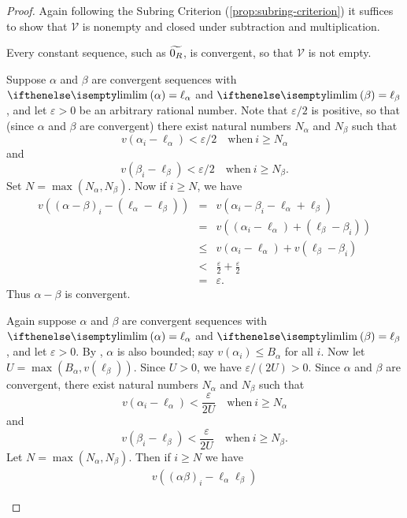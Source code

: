 \begin{proof}
Again following the Subring Criterion (\ref{prop:subring-criterion}) it suffices to show that \(\mathcal{V}\) is nonempty and closed under subtraction and multiplication.
\begin{inlineproplist}
\item Every constant sequence, such as \(\widetilde{0_R}\), is convergent, so that \(\mathcal{V}\) is not empty.
\item Suppose \(\alpha\) and \(\beta\) are convergent sequences with \(\LIM{\alpha} = \ell_\alpha\) and \(\LIM{\beta} = \ell_\beta\), and let \(\varepsilon > 0\) be an arbitrary rational number. Note that \(\varepsilon/2\) is positive, so that (since \(\alpha\) and \(\beta\) are convergent) there exist natural numbers \(N_\alpha\) and \(N_\beta\) such that \[ v(\alpha_i - \ell_\alpha) < \varepsilon/2 \quad \mathrm{when}\ i \geq N_\alpha \] and \[ v(\beta_i - \ell_\beta) < \varepsilon/2 \quad \mathrm{when}\ i \geq N_\beta. \] Set \(N = \max(N_\alpha, N_\beta)\). Now if \(i \geq N\), we have
\begin{eqnarray*}
v\left((\alpha - \beta)_i - (\ell_\alpha - \ell_\beta)\right)
 & = & v(\alpha_i - \beta_i - \ell_\alpha + \ell_\beta) \\
 & = & v\left((\alpha_i - \ell_\alpha) + (\ell_\beta - \beta_i)\right) \\
 & \leq & v(\alpha_i - \ell_\alpha) + v(\ell_\beta - \beta_i) \\
 & < & \frac{\varepsilon}{2} + \frac{\varepsilon}{2} \\
 & = & \varepsilon.
\end{eqnarray*}
Thus \(\alpha - \beta\) is convergent.
\item Again suppose \(\alpha\) and \(\beta\) are convergent sequences with \(\LIM{\alpha} = \ell_\alpha\) and \(\LIM{\beta} = \ell_\beta\), and let \(\varepsilon > 0\). By , \(\alpha\) is also bounded; say \(v(\alpha_i) \leq B_\alpha\) for all \(i\). Now let \(U = \max\left(B_\alpha, v(\ell_\beta)\right)\). Since \(U > 0\), we have \(\varepsilon/(2U) > 0\). Since \(\alpha\) and \(\beta\) are convergent, there exist natural numbers \(N_\alpha\) and \(N_\beta\) such that \[ v(\alpha_i - \ell_\alpha) < \frac{\varepsilon}{2U} \quad \mathrm{when}\ i \geq N_\alpha \] and \[ v(\beta_i - \ell_\beta) < \frac{\varepsilon}{2U} \quad \mathrm{when}\ i \geq N_\beta. \] Let \(N = \max(N_\alpha, N_\beta)\). Then if \(i \geq N\) we have
\begin{eqnarray*}
v((\alpha\beta)_i - \ell_\alpha \ell_\beta)

\end{eqnarray*}
\end{inlineproplist}
\end{proof}

